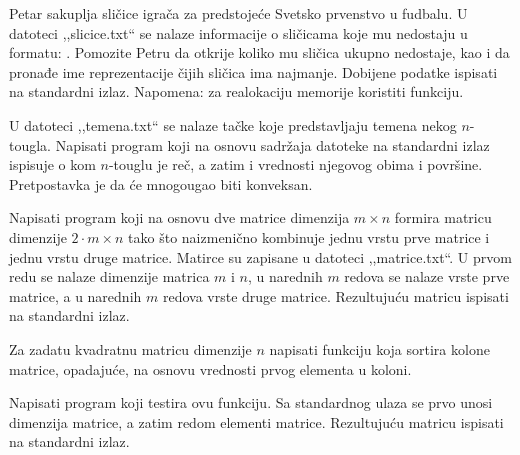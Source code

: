 \begin{Exercise}[label=340]
Petar sakuplja sličice igrača za predstojeće Svetsko
prvenstvo u fudbalu. U datoteci ,,slicice.txt`` se nalaze
informacije o sličicama koje mu nedostaju u formatu:
. Pomozite Petru
da otkrije koliko mu sličica ukupno nedostaje, kao i da
pronađe ime reprezentacije čijih sličica ima najmanje.
Dobijene podatke ispisati na standardni izlaz. Napomena: za
realokaciju memorije koristiti  funkciju.
\end{Exercise}
\begin{Answer}[ref=340]
\end{Answer}

\begin{Exercise}[label=341]
U datoteci ,,temena.txt`` se nalaze tačke koje predstavljaju
temena nekog $n$-tougla. Napisati program koji na osnovu
sadržaja datoteke na standardni izlaz ispisuje o kom
$n$-touglu je reč, a zatim i vrednosti njegovog obima i
površine. Pretpostavka je da će mnogougao biti konveksan.
\end{Exercise}
\begin{Answer}[ref=341]
\end{Answer}

\begin{Exercise}[label=342]
Napisati program koji na osnovu dve matrice dimenzija $m \times n$
formira matricu dimenzije $2 \cdot m \times n$ tako što
naizmenično kombinuje jednu vrstu prve matrice i jednu vrstu
druge matrice. Matirce su zapisane u datoteci ,,matrice.txt``. U
prvom redu se nalaze dimenzije matrica $m$ i $n$, u
narednih $m$ redova se nalaze vrste prve matrice, a u
narednih $m$ redova vrste druge matrice. Rezultujuću
matricu ispisati na standardni izlaz.
\end{Exercise}
\begin{Answer}[ref=342]
\end{Answer}

\begin{Exercise}[label=343]
Za zadatu kvadratnu matricu dimenzije $n$ napisati funkciju
koja sortira kolone matrice, opadajuće, na osnovu vrednosti
prvog elementa u koloni.

Napisati program koji testira ovu funkciju. Sa standardnog ulaza
se prvo unosi dimenzija matrice, a zatim redom elementi matrice.
Rezultujuću matricu ispisati na standardni izlaz.
\end{Exercise}
\begin{Answer}[ref=343]
\end{Answer}

